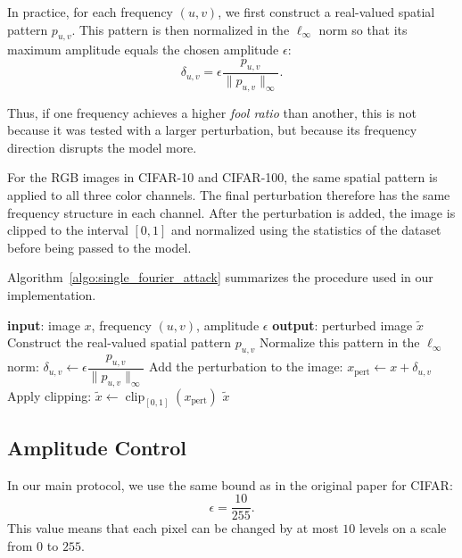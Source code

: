 In practice, for each frequency $(u,v)$, we first construct a real-valued spatial pattern
$p_{u,v}$. This pattern is then normalized in the $\ell_\infty$ norm so that its maximum amplitude
equals the chosen amplitude $\epsilon$:
\begin{equation}
    \delta_{u,v}
    =
    \epsilon
    \frac{p_{u,v}}{\|p_{u,v}\|_\infty}.
    \label{eq:normalisation_sfa}
\end{equation}

Thus, if one frequency achieves a higher \textit{fool ratio} than another,
this is not because it was tested with a larger perturbation, but because its
frequency direction disrupts the model more.

For the RGB images in CIFAR-10 and CIFAR-100, the same spatial pattern is applied to all three color
channels.
The final perturbation therefore has the same frequency structure in each channel. After the perturbation
is added, the image is clipped to the interval $[0,1]$ and normalized using the statistics of the dataset
before being passed to the model.

Algorithm~\ref{algo:single_fourier_attack} summarizes the procedure used in our implementation.

\begin{algorithm}[H]
\caption{Single Fourier Attack used in our protocol}
\label{algo:single_fourier_attack}
\begin{algorithmic}
\State \textbf{input}: image $x$, frequency $(u,v)$, amplitude $\epsilon$
\State \textbf{output}: perturbed image $\tilde{x}$
\State
\State Construct the real-valued spatial pattern $p_{u,v}$
\State Normalize this pattern in the $\ell_\infty$ norm:
\State \hspace{0.5cm} $\delta_{u,v} \leftarrow \epsilon \dfrac{p_{u,v}}{\|p_{u,v}\|_\infty}$
\State Add the perturbation to the image:
\State \hspace{0.5cm} $x_{\mathrm{pert}} \leftarrow x + \delta_{u,v}$
\State Apply clipping:
\State \hspace{0.5cm} $\tilde{x} \leftarrow \operatorname{clip}_{[0,1]}(x_{\mathrm{pert}})$
\State \Return $\tilde{x}$
\end{algorithmic}
\end{algorithm}

\subsection{Amplitude Control}

In our main protocol, we use the same bound as in the original paper
for CIFAR:
\[
    \epsilon = \frac{10}{255}.
\]
This value means that each pixel can be changed by at most $10$ levels on a scale from
$0$ to $255$.

